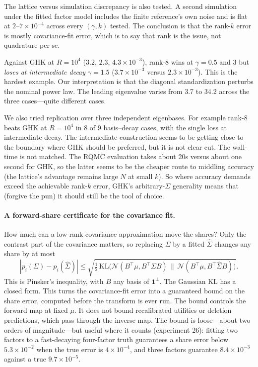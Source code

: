 \documentclass[12pt]{article}
\theoremstyle{remark}
\begin{document}
The lattice versus simulation discrepancy is also tested. A second simulation under the fitted factor model includes the finite
reference's own noise and is flat at $2$--$7\times10^{-4}$ across every $(\gamma,
k)$ tested. The conclusion is that the rank-$k$ error is mostly covariance-fit error, which is to say that 
rank is the issue, not quadrature per se. 

Against GHK at $R = 10^4$
($3.2$, $2.3$, $4.3\times10^{-3}$), rank-8 wins at $\gamma = 0.5$ and $3$
but \emph{loses at intermediate decay} $\gamma = 1.5$
($3.7\times10^{-3}$ versus $2.3\times10^{-3}$). This is the hardest example. 
Our interpretation is that the diagonal standardization 
perturbs the nominal power law. The leading eigenvalue varies from 3.7 to 34.2
across the three cases---quite different cases. 

We also tried replication over three independent eigenbases. For example rank-8 beats GHK at $R=10^4$
in 8 of 9 basis--decay cases, with the single loss at intermediate decay.
The intermediate construction seems to be getting close to the boundary where  GHK should be preferred, but 
it is not clear cut. The wall-time is not matched. The RQMC evaluation takes about 20s versus
about one second for GHK, so the latter seems to be the cheaper route to middling accuracy (the lattice's advantage remains large $N$ at small
$k$). So where accuracy demands exceed the achievable rank-$k$
error, GHK's arbitrary-$\Sigma$ generality means that (forgive the pun) it should still be the tool of choice.  

\paragraph{A forward-share certificate for the covariance fit.} How much can a low-rank
covariance approximation move the shares? Only the contrast part of the
covariance matters, so replacing $\Sigma$ by a fitted $\hat\Sigma$
changes any share by at most
\[
|p_i(\Sigma) - p_i(\hat\Sigma)| \le
\sqrt{\tfrac12\,\mathrm{KL}\big(\mathcal{N}(B^\top\mu, B^\top\Sigma B)\,\|\,
\mathcal{N}(B^\top\mu, B^\top\hat\Sigma B)\big)}.
\]
This is Pinsker's inequality, with $B$ any basis of $\mathbf{1}^\perp$.
The Gaussian KL has a closed form. This turns the covariance-fit error into a
guaranteed bound on the share error, computed before the transform is
ever run. The bound controls the forward map at fixed $\mu$. It does
not bound recalibrated utilities or deletion predictions, which pass
through the inverse map. The bound is loose---about two orders of magnitude---but
useful where it counts (experiment 26): fitting two factors to a
fast-decaying four-factor truth guarantees a share error below
$5.3\times10^{-2}$ when the true error is $4\times10^{-4}$, and three
factors guarantee $8.4\times10^{-3}$ against a true $9.7\times10^{-5}$.
\end{document}
